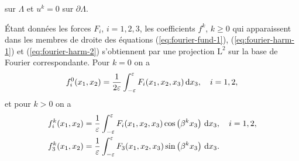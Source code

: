 sur $\Lambda$ et $u^k = 0$ sur $\partial \Lambda$.

Étant données les forces $F_i$, $i = 1,2,3$, les coefficients $f^k$,
$k \geq 0$ qui apparaissent dans les membres de droite des équations
(\ref{eq:fourier-fund-1}), (\ref{eq:fourier-harm-1}) et
(\ref{eq:fourier-harm-2}) s'obtiennent par une projection $\mathrm
L^2$ sur la base de Fourier correspondante. Pour $k = 0$ on a
\begin{align}
  f_i^0(x_1, x_2) =
  \frac{1}{2\varepsilon}\int_{-\varepsilon}^{\varepsilon}F_i(x_1, x_2, x_3)\,\mathrm
  dx_3, \quad i = 1,2,\label{eq:f-1}
\end{align}
et pour $k > 0$ on a
\begin{align}
&f_i^k(x_1, x_2) =
\frac{1}{\varepsilon}\int_{-\varepsilon}^{\varepsilon}F_i(x_1, x_2,
x_3)\cos\left( \beta^k x_3 \right)\,\mathrm dx_3,\quad i = 1,2,\label{eq:f-2}\\
&f_3^k(x_1, x_2) = \frac{1}{\varepsilon}\int_{-\varepsilon}^{\varepsilon}
F_3(x_1, x_2,x_3) \sin\left( \beta^k x_3 \right)\,\mathrm dx_3.\label{eq:f-3}
\end{align}


